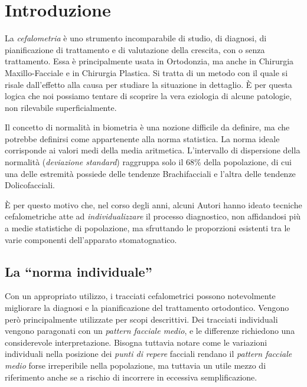 \chapter{Introduzione}
La \textit{cefalometria} è uno strumento incomparabile di studio, di diagnosi, di pianificazione di trattamento e di valutazione della crescita, con o senza trattamento. Essa è principalmente usata in Ortodonzia, ma anche in Chirurgia Maxillo-Facciale e in Chirurgia Plastica. Si tratta di un metodo con il quale si risale dall'effetto alla causa per studiare la situazione in dettaglio. È per questa logica che noi possiamo tentare di scoprire la vera eziologia di alcune patologie, non rilevabile superficialmente.

Il concetto di normalità in biometria è una nozione difficile da definire, ma che potrebbe definirsi come appartenente alla norma statistica. La norma ideale corrisponde ai valori medi della media aritmetica. L'intervallo di dispersione della normalità (\emph{deviazione standard}) raggruppa solo il 68\% della popolazione, di cui una delle estremità possiede delle tendenze Brachifacciali e l'altra delle tendenze Dolicofacciali.

È per questo motivo che, nel corso degli anni, alcuni Autori hanno ideato tecniche cefalometriche atte ad \textit{individualizzare} il processo diagnostico, non affidandosi più a medie statistiche di popolazione, ma sfruttando le proporzioni esistenti tra le varie componenti dell'apparato stomatognatico.

\section{La ``norma individuale''}

Con un appropriato utilizzo, i tracciati cefalometrici possono notevolmente migliorare la diagnosi e la pianificazione del trattamento ortodontico. Vengono però principalmente utilizzate per scopi descrittivi. Dei tracciati individuali vengono paragonati con un \textit{pattern facciale medio}, e le differenze richiedono una considerevole interpretazione. Bisogna tuttavia notare come le variazioni individuali nella posizione dei \textit{punti di repere} facciali rendano il \textit{pattern facciale medio} forse irreperibile nella popolazione, ma tuttavia un utile mezzo di riferimento anche se a rischio di incorrere in eccessiva semplificazione.

